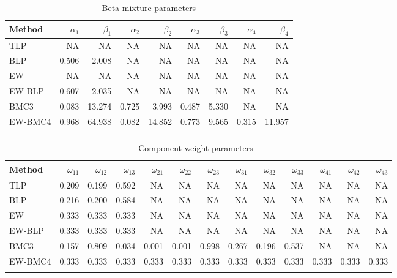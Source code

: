 \documentclass[
]{article}
\begin{document}
\begin{table}[H]

\caption{\label{tab:unnamed-chunk-19}Beta mixture parameters}
\centering
\fontsize{8}{10}\selectfont
\begin{tabular}[t]{lrrrrrrrr}
\toprule{}
Method & $\alpha_1$ & $\beta_1$ & $\alpha_2$ & $\beta_2$ & $\alpha_3$ & $\beta_3$ & $\alpha_4$ & $\beta_4$\\
\midrule{}
TLP & NA & NA & NA & NA & NA & NA & NA & NA\\
BLP & 0.506 & 2.008 & NA & NA & NA & NA & NA & NA\\
EW & NA & NA & NA & NA & NA & NA & NA & NA\\
EW-BLP & 0.607 & 2.035 & NA & NA & NA & NA & NA & NA\\
BMC3 & 0.083 & 13.274 & 0.725 & 3.993 & 0.487 & 5.330 & NA & NA\\
\addlinespace
EW-BMC4 & 0.968 & 64.938 & 0.082 & 14.852 & 0.773 & 9.565 & 0.315 & 11.957\\
\bottomrule{}
\end{tabular}
\end{table}

\begin{table}[H]

\caption{\label{tab:unnamed-chunk-19}Component weight parameters -}
\centering
\fontsize{8}{10}\selectfont
\begin{tabular}[t]{lrrrrrrrrrrrr}
\toprule{}
Method & $\omega_{11}$ & $\omega_{12}$ & $\omega_{13}$ & $\omega_{21}$ & $\omega_{22}$ & $\omega_{23}$ & $\omega_{31}$ & $\omega_{32}$ & $\omega_{33}$ & $\omega_{41}$ & $\omega_{42}$ & $\omega_{43}$\\
\midrule{}
TLP & 0.209 & 0.199 & 0.592 & NA & NA & NA & NA & NA & NA & NA & NA & NA\\
BLP & 0.216 & 0.200 & 0.584 & NA & NA & NA & NA & NA & NA & NA & NA & NA\\
EW & 0.333 & 0.333 & 0.333 & NA & NA & NA & NA & NA & NA & NA & NA & NA\\
EW-BLP & 0.333 & 0.333 & 0.333 & NA & NA & NA & NA & NA & NA & NA & NA & NA\\
BMC3 & 0.157 & 0.809 & 0.034 & 0.001 & 0.001 & 0.998 & 0.267 & 0.196 & 0.537 & NA & NA & NA\\
\addlinespace
EW-BMC4 & 0.333 & 0.333 & 0.333 & 0.333 & 0.333 & 0.333 & 0.333 & 0.333 & 0.333 & 0.333 & 0.333 & 0.333\\
\bottomrule{}
\end{tabular}
\end{table}
\end{document}

